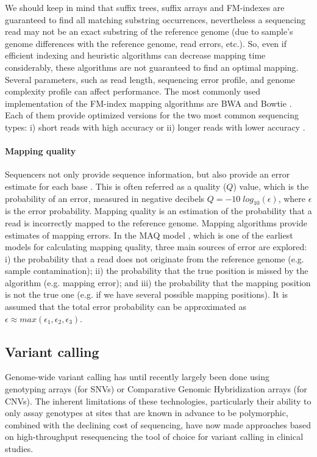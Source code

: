 We should keep in mind that suffix trees, suffix arrays and FM-indexes are guaranteed to find all matching substring occurrences, nevertheless a sequencing read may not be an exact substring of the reference genome (due to sample's genome differences with the reference genome, read errors, etc.). So, even if efficient indexing and heuristic algorithms can decrease mapping time considerably, these algorithms are not guaranteed to find an optimal mapping.  Several parameters, such as read length, sequencing error profile, and genome complexity profile can affect performance.  The most commonly used implementation of the FM-index mapping algorithms are BWA \cite{li2010fast, li2010fastlong} and Bowtie \cite{langmead2009ultrafast, langmead2012fast}.  Each of them provide optimized versions for the two most common sequencing types: i) short reads with high accuracy \cite{li2010fast,langmead2009ultrafast} or ii) longer reads with lower accuracy \cite{li2010fastlong, langmead2012fast}.

\paragraph{Mapping quality\label{sec:mapq}} Sequencers not only provide sequence information, but also provide an error estimate for each base \cite{li2011statistical}.  This is often referred as a quality ($Q$) value, which is the probability of an error, measured in negative decibels $Q = -10 \; log_{10}(\epsilon)$, where $\epsilon$ is the error probability. Mapping quality is an estimation of the probability that a read is incorrectly mapped to the reference genome. Mapping algorithms provide estimates of mapping errors. In the MAQ model \cite{li2008mapping}, which is one of the earliest models for calculating mapping quality, three main sources of error are explored: i) the probability that a read does not originate from the reference genome (e.g. sample contamination); ii) the probability that the true position is missed by the algorithm (e.g. mapping error); and iii) the probability that the mapping position is not the true one (e.g. if we have several possible mapping positions). It is assumed that the total error probability can be approximated as $\epsilon \approx max(\epsilon_1,\epsilon_2, \epsilon_3)$.

\subsection{Variant calling}

Genome-wide variant calling has until recently largely been done using genotyping arrays (for SNVs) or Comparative Genomic Hybridization arrays (for CNVs). The inherent limitations of these technologies, particularly their ability to only assay genotypes at sites that are known in advance to be polymorphic, combined with the declining cost of sequencing, have now made approaches based on high-throughput resequencing the tool of choice for variant calling in clinical studies. 

